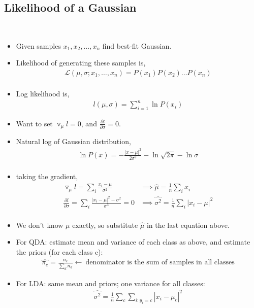 \documentclass[10pt]{article}
\begin{document}
	\subsection*{Likelihood of a Gaussian}
		\
		\begin{itemize}
			\item Given samples $x_{1}, x_{2}, \dots, x_{n}$ find best-fit Gaussian.
			\item Likelihood of generating these samples is,
				\begin{align*}
					\mathcal{L}(\mu, \sigma;x_{1}, \dots, x_{n}) = P(x_{1})P(x_{2}) \dots P(x_{n})\\
				\end{align*}
			\item Log likelihood is,
				\begin{align*}
					l(\mu, \sigma) = \sum_{i=1}^{n} \ln P(x_{i})
				\end{align*}
			\item Want to set $\triangledown_{\mu} l = 0$, and  $\frac{\partial l}{\partial \sigma} = 0$.
			\item Natural log of Gaussian distribution,
				\begin{align*}
					\ln P(x) = -\frac{|x-\mu|^{2}}{2\sigma^{2}} - \ln \sqrt{2\pi} - \ln \sigma\\
				\end{align*}
			\item taking the gradient,
				\begin{align*}
					\triangledown_{\mu}l = \sum_{i} \frac{x_{i}-\mu}{\sigma^{2}} &\implies \hat{\mu} = \frac{1}{n} \sum_{i} x_{i}\\
					\frac{\partial l}{\partial \sigma} = \sum_{i} \frac{|x_{i} - \mu|^{2} - \sigma^{2}}{\sigma^{3}} = 0 &\implies \hat{\sigma^{2}} = \frac{1}{n} \sum_{i} |x_{i} - \mu|^{2}\\
				\end{align*}
			\item We don't know $\mu$ exactly, so substitute $\hat{\mu}$ in the last equation above.
			\item For QDA: estimate mean and variance of each class as above, and estimate the priors (for each class c):
				\begin{align*}
					\hat{\pi_{c}} = \frac{n_{c}}{\sum_{d} n_{d}} \leftarrow \ \text{denominator is the sum of samples in all classes}
				\end{align*}
			\item For LDA: same mean and priors; one variance for all classes:
				\begin{align*}
					\hat{\sigma^{2}} = \frac{1}{n} \sum_{c} \sum_{i:y_{i}=c} |x_{i} - \mu_{c}|^{2}
				\end{align*}
		\end{itemize}
\end{document}

